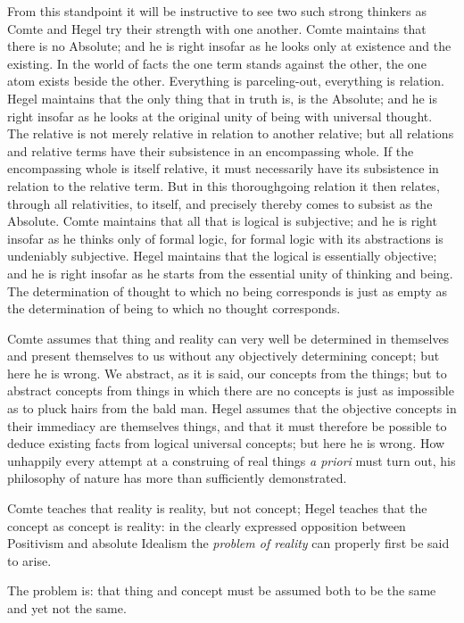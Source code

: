 \documentclass[12pt]{article}
\begin{document}
From this standpoint it will be instructive to see two such strong thinkers
as Comte and Hegel try their strength with
one another. Comte maintains that there is no Absolute; and he is right
insofar as he looks only at existence and the existing. In the world of
facts the one term stands against the other, the one atom exists beside the
other. Everything is parceling-out, everything is relation. Hegel maintains
that the only thing that in truth is, is the Absolute; and he is right
insofar as he looks at the original unity of being with universal thought.
The relative is not merely relative in relation to another relative; but all
relations and relative terms have their subsistence in an encompassing
whole. If the encompassing whole is itself relative, it must necessarily
have its subsistence in relation to the relative term. But in this
thoroughgoing relation it then relates, through all relativities, to itself,
and precisely thereby comes to subsist as the Absolute. Comte maintains that
all that is logical is subjective; and he is right insofar as he thinks only
of formal logic, for formal logic with its abstractions is undeniably
subjective. Hegel maintains that the logical is essentially objective; and
he is right insofar as he starts from the essential unity of thinking and
being. The determination of thought to which no being corresponds is just
as empty as the determination of being to which no thought corresponds.

Comte assumes that thing and reality can very well be determined in
themselves and present themselves to us without any objectively determining
concept; but here he is wrong. We abstract, as it is said, our concepts from
the things; but to abstract concepts from things in which there are no
concepts is just as impossible as to pluck hairs from the bald man. Hegel
assumes that the objective concepts in their immediacy are themselves
things, and that it must therefore be possible to deduce existing facts from
logical universal concepts; but here he is wrong. How unhappily every
attempt at a construing of real things \textit{a priori} must turn out, his
philosophy of nature has more than sufficiently demonstrated.

Comte teaches that reality is reality, but not concept; Hegel teaches that
the concept as concept is reality: in the clearly
expressed opposition between Positivism and absolute Idealism the
\emph{problem of reality} can properly first be said to arise.

The problem is: that thing and concept must be assumed both to be the same
and yet not the same.
\end{document}
